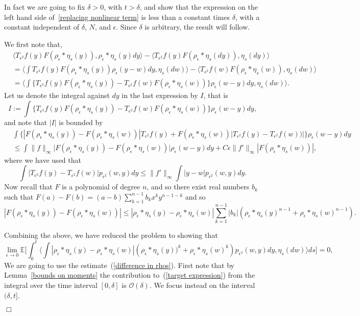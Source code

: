 \documentclass[12pt]{article}
\newenvironment {proof}{{\noindent\bf Proof }}{\hfill $\Box$ \medskip}
\newcommand{\IE}{\mathbb E}
\numberwithin{equation}{section}
\begin{document}
\begin{proof}
In fact we are going to fix $\delta>0$, with $t>\delta$, and show that
the expression on the left hand side of~\eqref{replacing nonlinear term} is
less than a constant times $\delta$, with a constant independent of $\delta$,
$N$, and $\epsilon$. Since $\delta$ is arbitrary, the result will follow.

We first note that,
\begin{align*}
    &
\langle T_{\epsilon^2} f(y) F(\rho_\epsilon * \eta_s(y)), 
\rho_\epsilon * \eta_s(y) dy \rangle 
-\langle T_{\epsilon^2} f(y) F(\rho_\epsilon *\eta_s(dy)), \eta_s(dy) \rangle 
\\ 
& = 
\langle \int T_{\epsilon^2} f(y) 
F(\rho_\epsilon * \eta_s(y))\rho_\epsilon(y-w) dy, \eta_s(dw)\rangle - \langle 
T_{\epsilon^2} f(w) F(\rho_\epsilon*\eta_s(w)), \eta_s(dw) \rangle 
\\ 
&= 
\langle \int \big\{ T_{\epsilon^2} f(y) F(\rho_\epsilon*\eta_s(y))-T_{\epsilon^2}f(w) 
F(\rho_\epsilon*\eta_s(w))\big\} 
\rho_\epsilon(w-y)dy, \eta_s(dw) \rangle.
\end{align*}
Let us denote the integral against $dy$ in the last expression by $I$, that is 
\[ I :=  \int \{ T_{\epsilon^2} f(y) 
F(\rho_\epsilon*\eta_s(y))-T_{\epsilon^2}f(w) 
F(\rho_\epsilon*\eta_s(w))\} \rho_\epsilon(w-y)dy, \]
and note that $|I|$ is bounded by
\begin{align}
& \int 
\Big\{ |F(\rho_\epsilon*\eta_s(y))-F(\rho_\epsilon*\eta_s(w))|T_{\epsilon^2}f(y)+
F(\rho_\epsilon*\eta_s(w))|T_{\epsilon^2}f(y)-T_{\epsilon^2}f(w))|\Big\} 
\rho_{\epsilon}(w-y)dy
\nonumber \\ &\leq \int \| f\|_{\infty} 
\big|F(\rho_\epsilon*\eta_s(y))-F(\rho_\epsilon*\eta_s(w))\big| \rho_\epsilon(w-y)dy + 
C \epsilon\|f' \|_\infty |F(\rho_\epsilon*\eta_s(w))|, \label{FirstBoundCT}
\end{align}
where we have used that 
\[
\int |T_{\epsilon^2}f(y)-T_{\epsilon^2}f(w)| p_{\epsilon^2}(w,y)dy
\leq \|f'\|_\infty\int|y-w|p_{\epsilon^2}(w,y)dy.
\]
Now recall that $F$ is a polynomial of degree $n$, and so 
there exist real numbers $b_k$ such
that $F(a)-F(b)= (a-b)\sum_{k=1}^{n-1}b_kx^ky^{n-1-k}$ and so 
\[
|F(\rho_\epsilon*\eta_s(y))-F(\rho_\epsilon*\eta_s(w))|
\leq 
|\rho_\epsilon*\eta_s(y)-\rho_\epsilon*\eta_s(w)|
\sum_{k=1}^{n-1}|b_k|\left(\rho_\epsilon*\eta_s(y)^{n-1}+\rho_\epsilon*\eta_s(w)^{n-1}\right).
\]

Combining the above, we have reduced the problem to showing that 
\begin{equation}
\label{target expression}
	\lim_{\epsilon\to 0}
	\IE\Big[	\int_0^t\big\langle \int |\rho_\epsilon*\eta_s(y)-\rho_\epsilon*\eta_s(w)|
\left(\rho_\epsilon*\eta_s(y))^k+\rho_\epsilon*\eta_s(w)^k\right)
	p_{\epsilon^2}(w,y)dy, \eta_s(dw)\big\rangle ds\Big]
=0,
\end{equation}
We are going to use the estimate~(\ref{difference in rhos}).
First note that by Lemma~\ref{bounds on moments}
the contribution to~(\ref{target expression}) from the integral over
the time interval $[0,\delta]$ is ${\mathcal O}(\delta)$. We focus instead
on the interval $(\delta, t]$.


\end{proof}
\end{document}
